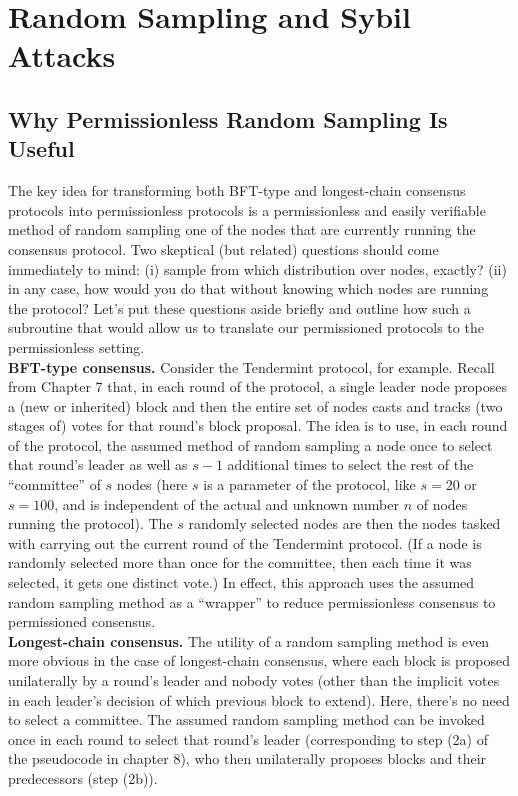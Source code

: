 \section{Random Sampling and Sybil Attacks}
\subsection{Why Permissionless Random Sampling Is Useful}
The key idea for transforming both BFT-type and longest-chain consensus protocols into
permissionless protocols is a permissionless and easily verifiable method of random sampling
one of the nodes that are currently running the consensus protocol. Two skeptical (but related)
questions should come immediately to mind: (i) sample from which distribution over nodes,
exactly? (ii) in any case, how would you do that without knowing which nodes are running
the protocol? Let’s put these questions aside briefly and outline how such a subroutine that 
would allow us to translate our permissioned protocols to the permissionless setting.\\

\noindent
\textbf{BFT-type consensus.} Consider the Tendermint protocol, for example. Recall from Chapter 7 that, in each round of the protocol, a single leader node proposes a (new or inherited)
block and then the entire set of nodes casts and tracks (two stages of) votes for that round’s
block proposal. The idea is to use, in each round of the protocol, the assumed method of
random sampling a node once to select that round’s leader as well as $s - 1$ additional times
to select the rest of the “committee” of $s$ nodes (here $s$ is a parameter of the protocol, like
$s = 20$ or $s = 100$, and is independent of the actual and unknown number $n$ of nodes running
the protocol). The $s$ randomly selected nodes are then the nodes tasked with carrying out
the current round of the Tendermint protocol. (If a node is randomly selected more than
once for the committee, then each time it was selected, it gets one distinct vote.) In
effect, this approach uses the assumed random sampling method as a “wrapper” to reduce
permissionless consensus to permissioned consensus.\\

\noindent
\textbf{Longest-chain consensus.} The utility of a random sampling method is even more obvious
in the case of longest-chain consensus, where each block is proposed unilaterally by a round’s
leader and nobody votes (other than the implicit votes in each leader’s decision of which
previous block to extend). Here, there’s no need to select a committee. The assumed
random sampling method can be invoked once in each round to select that round’s leader
(corresponding to step (2a) of the pseudocode in chapter 8), who then unilaterally proposes
blocks and their predecessors (step (2b)).

